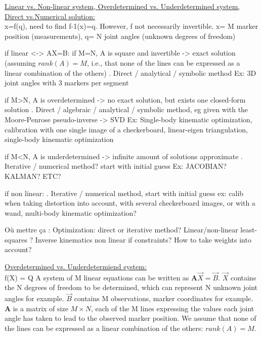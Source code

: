 \vspace*{0.5cm}

\noindent\underline{Linear vs. Non-linear system, Overdetermined vs. Underdetermined system, \\Direct vs.Numerical solution:}\\


x=f(q), need to find f-1(x)=q. However, f not necessarily invertible. x= M marker position (measurements), q= N joint angles (unknown degrees of freedom)

if linear <-> AX=B: 
      if M=N, A is square and invertible -> exact solution (assuming $rank(A)=M$, i.e., that none of the lines can be expressed as a linear combination of the others)
      . Direct / analytical / symbolic method
      Ex: 3D joint angles with 3 markers per segment

      if M>N, A is overdetermined -> no exact solution, but exists one closed-form solution 
      . Direct / algebraic / analytical / symbolic method, eg given with the Moore-Penrose pseudo-inverse -> SVD  
      Ex: Single-body kinematic optimization, calibration with one single image of a checkerboard, linear-eigen triangulation, single-body kinematic optimization

      if M<N, A is underdetermined -> infinite amount of solutions approximate
      . Iterative / numerical method? start with initial guess
      Ex: JACOBIAN? KALMAN? ETC?

if non linear:
      . Iterative / numerical method, start with initial guess
      ex: calib when taking distortion into account, with several checkerboard images, or with a wand, 
      multi-body kinematic optimization?


Où mettre ça :
      Optimization: direct or iterative method?
      Linear/non-linear least-squares ?
      Inverse kinematics non linear if constraints? How to take weights into account?
      



\vspace*{0.5cm}

\noindent\underline{Overdetermined vs. Underdetermiend system:}\\
f(X) = Q
A system of M linear equations can be written as $\textbf{A} \overrightarrow{X}=\overrightarrow{B}$. $\overrightarrow{X}$ contains the N degrees of freedom to be determined, which can represent N unknown joint angles for example. $\overrightarrow{B}$ contains M observations, marker coordinates for example. \textbf{A} is a matrix of size $M \times N$, each of the M lines expressing the values each joint angle has taken to lead to the observed marker position. We assume that none of the lines can be expressed as a linear combination of the others: $rank(A)=M$.

